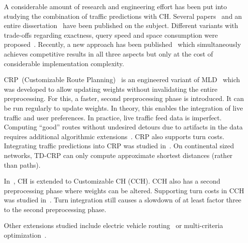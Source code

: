 \documentclass[manuscript,review]{acmart}
\begin{document}
A considerable amount of research and engineering effort has been put into studying the combination of traffic predictions with CH.
Several papers~\cite{bdsv-tdch-09,bgns-tdcha-10,klsv-dtdch-10,bgsv-mtdtt-13} and an entire dissertation~\cite{b-tdrpc-14} have been published on the subject.
Different variants with trade-offs regarding exactness, query speed and space consumption were proposed~\cite{bgsv-mtdtt-13}.
Recently, a new approach has been published~\cite{swz-sfert-21} which simultaneously achieves competitive results in all three aspects but only at the cost of considerable implementation complexity. %

CRP~(Customizable Route Planning)~\cite{dgpw-crprn-13} is an engineered variant of MLD~\cite{swz-umlgt-02} which was developed to allow updating weights without invalidating the entire preprocessing.
For this, a faster, second preprocessing phase is introduced.
It can be run regularly to update weights.
In theory, this enables the integration of live traffic and user preferences.
In practice, live traffic feed data is imperfect.
Computing ``good'' routes without undesired detours due to artifacts in the data requires additional algorithmic extensions~\cite{dss-tarrn-18}.
CRP also supports turn costs.
Integrating traffic predictions into CRP was studied in~\cite{bdpw-dtdrp-16}.
On continental sized networks, TD-CRP can only compute approximate shortest distances (rather than paths).

In~\cite{dsw-cch-15}, CH is extended to Customizable CH (CCH). %
CCH also has a second preprocessing phase where weights can be altered.
Supporting turn costs in CCH was studied in~\cite{bwzz-cchtc-20}.
Turn integration still causes a slowdown of at least factor three to the second preprocessing phase.

Other extensions studied include electric vehicle routing~\cite{DBLP:journals/algorithmica/BaumDPSWZ20,DBLP:conf/aaai/EisnerFS11} or multi-criteria optimization~\cite{fns-opca-14,gks-rpfof-10}.

\end{document}
